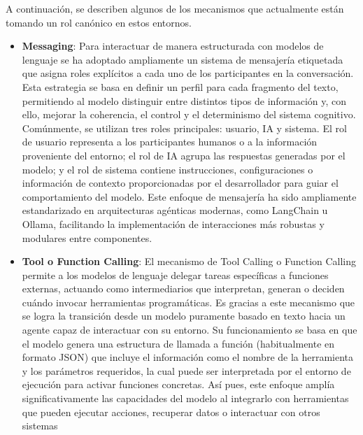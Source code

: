 A continuación, se describen algunos de los mecanismos que actualmente 
están tomando un rol canónico en estos entornos.

\begin{itemize}

\item \textbf{Messaging}: Para interactuar de manera estructurada con 
    modelos de lenguaje se ha adoptado ampliamente un sistema
    de mensajería etiquetada que asigna roles explícitos a cada uno de los
    participantes en la conversación. Esta estrategia se basa en definir un perfil
    para cada fragmento del texto, permitiendo al modelo distinguir
    entre distintos tipos de información y, con ello, mejorar la coherencia, el
    control y el determinismo del sistema cognitivo. Comúnmente, se utilizan tres
    roles principales: usuario, IA y sistema. El rol de usuario representa a los
    participantes humanos o a la información proveniente del entorno; el rol de IA
    agrupa las respuestas generadas por el modelo; y el rol de sistema contiene
    instrucciones, configuraciones o información de contexto proporcionadas por el
    desarrollador para guiar el comportamiento del modelo. Este enfoque de
    mensajería ha sido ampliamente estandarizado en arquitecturas agénticas
    modernas, como LangChain u Ollama, facilitando la implementación de
    interacciones más robustas y modulares entre componentes. 

\item \textbf{Tool o Function Calling}: El mecanismo de Tool Calling o Function
    Calling permite a los modelos de lenguaje delegar tareas específicas a funciones
    externas, actuando como intermediarios que interpretan, generan o deciden cuándo
    invocar herramientas programáticas. Es gracias a este mecanismo que se logra la
    transición desde un modelo puramente basado en texto hacia un agente capaz de
    interactuar con su entorno. Su funcionamiento se basa en que el modelo genera
    una estructura de llamada a función (habitualmente en formato JSON) que incluye
    el información como el nombre de la herramienta y los parámetros requeridos, 
    la cual puede ser interpretada por el entorno de ejecución para activar funciones 
    concretas. Así pues, este enfoque amplía significativamente las capacidades del modelo al
    integrarlo con herramientas que pueden ejecutar acciones, recuperar datos o 
    interactuar con otros sistemas


\end{itemize}
